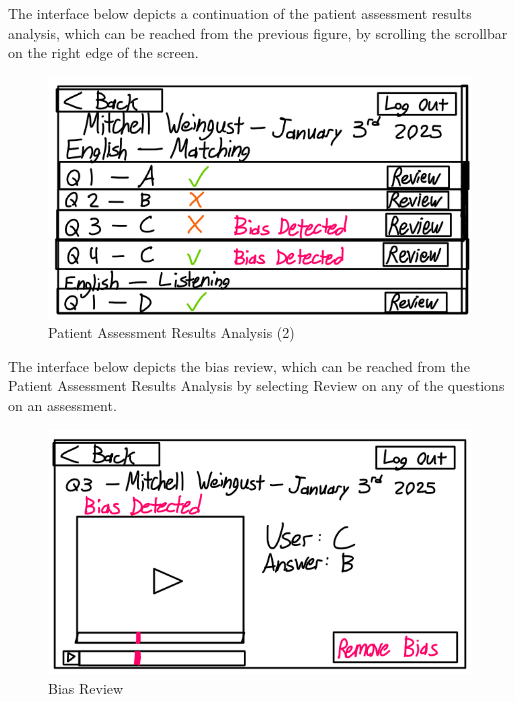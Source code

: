 \documentclass[12pt, titlepage]{article}
\begin{document}
\hspace{1.5em}The interface below depicts a continuation of the patient assessment results analysis, which can be reached from the previous figure, by scrolling the scrollbar on the right edge of the screen.
\begin{figure}[H]
  \centering
  \includegraphics[scale=0.9]{images/Patient-Assessment-Results-Analysis-2.png}
  \caption{Patient Assessment Results Analysis (2)}
\end{figure}

\hspace{1.5em}The interface below depicts the bias review, which can be reached from the Patient Assessment Results Analysis by selecting Review on any of the questions on an assessment.
\begin{figure}[H]
  \centering
  \includegraphics[scale=0.9]{images/Review-Bias.png}
  \caption{Bias Review}
\end{figure}
\end{document}
